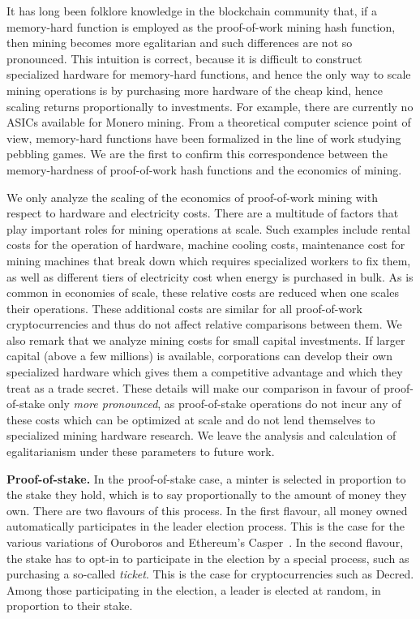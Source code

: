 It
has long been folklore knowledge in the blockchain community that, if a
memory-hard function is employed as the proof-of-work mining hash function, then
mining becomes more egalitarian and such differences are not so pronounced. This intuition is correct, because
it is difficult to construct specialized hardware for memory-hard functions, and
hence the only way to scale mining operations is by purchasing more hardware of
the cheap kind, hence scaling returns proportionally to investments. For
example, there are currently no ASICs available for Monero mining. From a theoretical computer
science point of view, memory-hard functions have been formalized in the line of
work studying pebbling games. We are the first to confirm this correspondence between the
memory-hardness of proof-of-work hash functions and the economics of mining.

\begin{remark}\label{rmk:pow-scale}
We only analyze the scaling of the economics of proof-of-work mining with
respect to hardware and electricity costs. There are a multitude of factors that
play important roles for mining operations at scale. Such examples include rental
costs for the operation of hardware, machine cooling costs, maintenance cost
for mining machines that break down which requires specialized workers to fix
them, as well as different tiers of electricity cost when energy is purchased in
bulk. As is common in economies of scale, these relative costs are reduced when
one scales their operations. These additional costs are similar for all
proof-of-work cryptocurrencies and thus do not affect relative comparisons
between them. We also remark that we analyze mining costs for small capital
investments. If larger capital (above a few millions) is available,
corporations can develop their own specialized hardware which
gives them a competitive advantage and which they treat as a trade secret.
These details will make our comparison in favour of proof-of-stake only
\emph{more pronounced}, as proof-of-stake operations do not incur any
of these costs which can be optimized at scale and do not lend themselves to
specialized mining hardware research. We leave the analysis and calculation
of egalitarianism under these parameters to future work.
\end{remark}

\noindent\textbf{Proof-of-stake.}
In the proof-of-stake case, a minter is selected in proportion to the stake they
hold, which is to say proportionally to the amount of money they own. There are
two flavours of this process. In the first flavour, all money owned automatically participates in the leader election
process. This is the case for the various variations of Ouroboros
and Ethereum's Casper~\cite{buterin2017casper}. In the second flavour, the stake has to opt-in to participate in
the election by a special process, such as purchasing a so-called \emph{ticket}. This is the case for cryptocurrencies such as
Decred. Among those participating in the election, a leader is
elected at random, in proportion to their stake.

